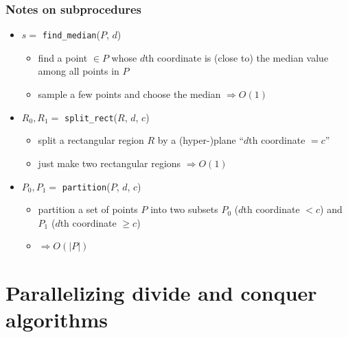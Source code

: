 \documentclass[12pt,dvipdfmx]{beamer}
\newcommand{\mura}[1]{{\color{purple}#1}}
\newcommand{\ao}[1]{{\color{blue}#1}}
\begin{document}
\begin{frame}[fragile]
\frametitle{Notes on subprocedures}

\begin{itemize}
\item $s = $ \mura{\tt find\_median}($P$, $d$)
  \begin{itemize}
  \item find a point $\in P$ whose $d$th coordinate
    is (close to) the median value among all points in $P$
  \item sample a few points and choose the median 
    \ao{$\Rightarrow O(1)$}
  \end{itemize}

\item $R_0,R_1 = $ \mura{\tt split\_rect}($R$, $d$, $c$)
  \begin{itemize}
  \item split a rectangular region $R$ by a (hyper-)plane
    ``$d$th coordinate $= c$''
  \item just make two rectangular regions 
    \ao{$\Rightarrow O(1)$}
  \end{itemize}

\item $P_0,P_1 = $ \mura{\tt partition}($P$, $d$, $c$)
  \begin{itemize}
  \item partition a set of points $P$ into two subsets $P_0$
    ($d$th coordinate $< c$) and $P_1$ ($d$th coordinate $\geq c$)
  \item \ao{$\Rightarrow O(|P|)$}
  \end{itemize}
\end{itemize}
\end{frame}


\section{Parallelizing divide and conquer algorithms}
\end{document}
